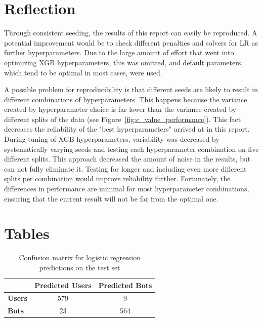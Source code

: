 \documentclass[twocolumn]{article}
\begin{document}
\section{Reflection}

Through consistent seeding, the results of this report can easily be reproduced. A potential improvement would be to check different penalties and solvers for LR as further hyperparameters. Due to the large amount of effort that went into optimizing XGB hyperparameters, this was omitted, and default parameters, which tend to be optimal in most cases, were used.

A possible problem for reproducibility is that different seeds are likely to result in different combinations of hyperparameters. This happens because the variance created by hyperparameter choice is far lower than the variance created by different splits of the data (see Figure~\ref{fig:c_value_performance}). This fact decreases the reliability of the "best hyperparameters" arrived at in this report. During tuning of XGB hyperparameters, variability was decreased by systematically varying seeds and testing each hyperparameter combination on five different splits. This approach decreased the amount of noise in the results, but can not fully eliminate it. Testing for longer and including even more different splits per combination would improve reliability further. Fortunately, the differences in performance are minimal for most hyperparameter combinations, ensuring that the current result will not be far from the optimal one.

\printbibliography

\onecolumn
\appendix
\newpage

\section{Tables}
\renewcommand{\thetable}{A.\arabic{table}}
\setcounter{table}{0}

\begin{table}[H]
\centering
\caption{Confusion matrix for logistic regression predictions on the test set}
\label{tab:log_confusion}
\begin{tabular}{lcc}
\toprule
 & \textbf{Predicted Users} & \textbf{Predicted Bots} \\
\midrule
\textbf{Users} & 579 & 9 \\
\textbf{Bots} & 23  & 564 \\
\bottomrule
\end{tabular}
\end{table}
\end{document}
